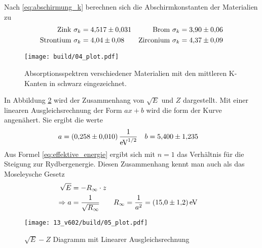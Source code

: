 \noindent
Nach \eqref{eq:abschirmung_k} berechnen sich die Abschirmkonstanten der Materialien zu
\begin{align*}
    \text{Zink      } \sigma_k &= \num{4.517 \pm 0.031} &
    \text{Brom      } \sigma_k &= \num{3.90 \pm 0.06} \\
    \text{Strontium } \sigma_k &= \num{4.04 \pm 0.08} &
    \text{Zirconium } \sigma_k &= \num{4.37 \pm 0.09} 
\end{align*}

\begin{figure}
    \centering
    \texttt{[image: build/04\_plot.pdf]}
    \caption{Absorptionsspektren verschiedener Materialien mit den mittleren K-Kanten in schwarz eingezeichnet.}
    \label{fig:04}
\end{figure}

In Abbildung \ref{fig:05} wird der Zusammenhang von $\sqrt{E}$ und $Z$ dargestellt.
Mit einer linearen Ausgleichsrechnung der Form $ax +b$ wird die form der Kurve angenähert.
Sie ergibt die werte
\begin{align}
    a &= \qty{0.258 \pm 0.010}{\electronvolt\tothe{-1/2}} &
    b &= \num{5.400 \pm 1.235}
\end{align}
Aus Formel \eqref{eq:effektive_energie} ergibt sich mit $n=1$ das Verhältnis für die Steigung zur Rydbergenergie.
Diesen Zusammenhang kennt man auch als das Moseleysche Gesetz
\begin{align*}
    \sqrt{E} &= - R_\infty \cdot z\\
\Rightarrow    a &= \frac{1}{\sqrt{R_\infty}}
&    R_\infty = \frac{1}{a^2} &= \qty{15 \pm 1.2}{\eV}
\end{align*}


\begin{figure}
    \texttt{[image: 13\_v602/build/05\_plot.pdf]}
    \caption{$\sqrt{E}-Z$ Diagramm mit Linearer Ausgleichsrechnung }
    \label{fig:05}
\end{figure}



